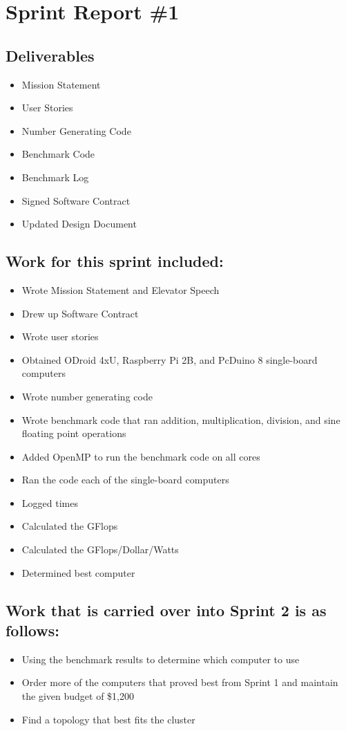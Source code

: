 

\section{Sprint Report \#1}

\subsection*{Deliverables}
\begin{itemize}
	\item Mission Statement
	\item User Stories
	\item Number Generating Code
	\item Benchmark Code
	\item Benchmark Log
	\item Signed Software Contract
	\item Updated Design Document
\end{itemize}

\subsection*{Work for this sprint included:}
\begin{itemize}
	\item Wrote Mission Statement and Elevator Speech
	\item Drew up Software Contract
	\item Wrote user stories
	\item Obtained ODroid 4xU, Raspberry Pi 2B, and PcDuino 8 single-board computers
	\item Wrote number generating code
	\item Wrote benchmark code that ran addition, multiplication, division, and sine floating point operations
	\item Added OpenMP to run the benchmark code on all cores
	\item Ran the code each of the single-board computers
	\item Logged times
	\item Calculated the GFlops
	\item Calculated the GFlops/Dollar/Watts
	\item Determined best computer
\end{itemize}
\subsection*{Work that is carried over into Sprint 2 is as follows:}
\begin{itemize}
	\item Using the benchmark results to determine which computer to use
	\item Order more of the computers that proved best from Sprint 1 and maintain the given budget of \$1,200
	\item Find a topology that best fits the cluster
\end{itemize}

